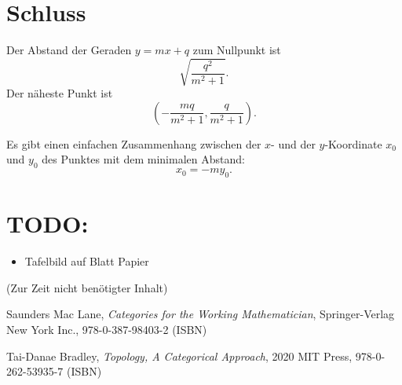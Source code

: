 \documentclass[a4paper]{amsart}
\theoremstyle{definition}
\begin{document}
\section{Schluss}
Der Abstand der Geraden $y=mx+q$ zum Nullpunkt ist 
\begin{equation}
	\sqrt{\frac{q^2}{m^2+1}}.
\end{equation}
Der näheste Punkt ist
\begin{equation}
	\left( -\frac{mq}{m^2+1}, \frac{q}{m^2+1} \right).
\end{equation}

Es gibt einen einfachen Zusammenhang zwischen der $x$- und der $y$-Koordinate $x_0$ und $y_0$ des Punktes mit dem minimalen Abstand:
\begin{equation}
   x_0 = -my_0.
\end{equation}

\section{TODO:}
\begin{itemize}
   \item Tafelbild auf Blatt Papier
\end{itemize}

\begin{backup}
    (Zur Zeit nicht benötigter Inhalt)
\end{backup}

\begin{thebibliography}{9}

      Saunders Mac Lane, \emph{Categories for the Working Mathematician},
      Springer-Verlag New York Inc., 978-0-387-98403-2 (ISBN)
      
      Tai-Danae Bradley, \emph{Topology, A Categorical Approach},
      2020 MIT Press, 978-0-262-53935-7 (ISBN)

\end{thebibliography}
\end{document}
